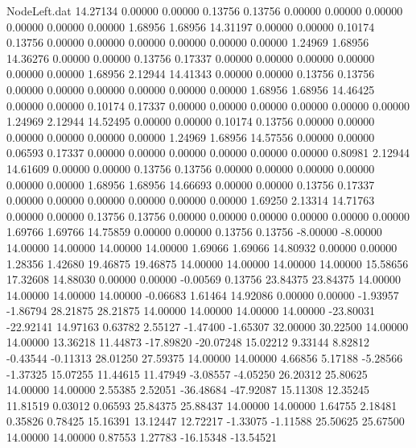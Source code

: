 \begin{filecontents}{NodeLeft.dat}
  14.27134    0.00000    0.00000     0.13756    0.13756    0.00000    0.00000    0.00000    0.00000    0.00000    0.00000    1.68956    1.68956
  14.31197    0.00000    0.00000     0.10174    0.13756    0.00000    0.00000    0.00000    0.00000    0.00000    0.00000    1.24969    1.68956
  14.36276    0.00000    0.00000     0.13756    0.17337    0.00000    0.00000    0.00000    0.00000    0.00000    0.00000    1.68956    2.12944
  14.41343    0.00000    0.00000     0.13756    0.13756    0.00000    0.00000    0.00000    0.00000    0.00000    0.00000    1.68956    1.68956
  14.46425    0.00000    0.00000     0.10174    0.17337    0.00000    0.00000    0.00000    0.00000    0.00000    0.00000    1.24969    2.12944
  14.52495    0.00000    0.00000     0.10174    0.13756    0.00000    0.00000    0.00000    0.00000    0.00000    0.00000    1.24969    1.68956
  14.57556    0.00000    0.00000     0.06593    0.17337    0.00000    0.00000    0.00000    0.00000    0.00000    0.00000    0.80981    2.12944
  14.61609    0.00000    0.00000     0.13756    0.13756    0.00000    0.00000    0.00000    0.00000    0.00000    0.00000    1.68956    1.68956
  14.66693    0.00000    0.00000     0.13756    0.17337    0.00000    0.00000    0.00000    0.00000    0.00000    0.00000    1.69250    2.13314
  14.71763    0.00000    0.00000     0.13756    0.13756    0.00000    0.00000    0.00000    0.00000    0.00000    0.00000    1.69766    1.69766
  14.75859    0.00000    0.00000     0.13756    0.13756   -8.00000   -8.00000   14.00000   14.00000   14.00000   14.00000    1.69066    1.69066
  14.80932    0.00000    0.00000     1.28356    1.42680   19.46875   19.46875   14.00000   14.00000   14.00000   14.00000   15.58656   17.32608
  14.88030    0.00000    0.00000    -0.00569    0.13756   23.84375   23.84375   14.00000   14.00000   14.00000   14.00000   -0.06683    1.61464
  14.92086    0.00000    0.00000    -1.93957   -1.86794   28.21875   28.21875   14.00000   14.00000   14.00000   14.00000  -23.80031  -22.92141
  14.97163    0.63782    2.55127    -1.47400   -1.65307   32.00000   30.22500   14.00000   14.00000   13.36218   11.44873  -17.89820  -20.07248
  15.02212    9.33144    8.82812    -0.43544   -0.11313   28.01250   27.59375   14.00000   14.00000    4.66856    5.17188   -5.28566   -1.37325
  15.07255   11.44615   11.47949    -3.08557   -4.05250   26.20312   25.80625   14.00000   14.00000    2.55385    2.52051  -36.48684  -47.92087
  15.11308   12.35245   11.81519     0.03012    0.06593   25.84375   25.88437   14.00000   14.00000    1.64755    2.18481    0.35826    0.78425
  15.16391   13.12447   12.72217    -1.33075   -1.11588   25.50625   25.67500   14.00000   14.00000    0.87553    1.27783  -16.15348  -13.54521

\end{filecontents}
